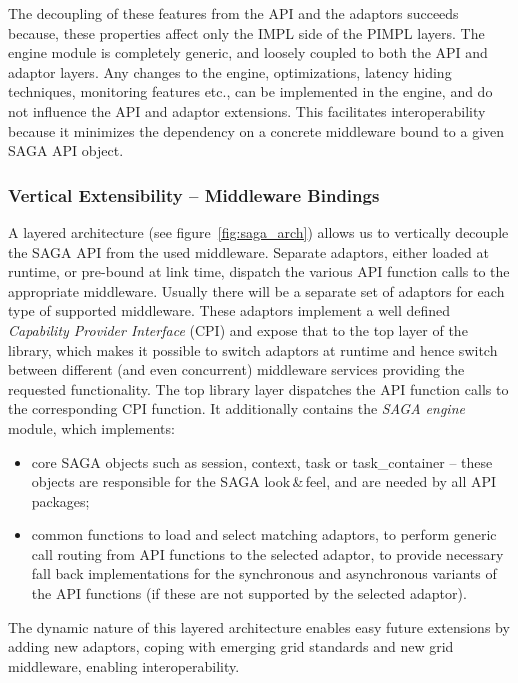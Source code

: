 \documentclass[conference,final]{IEEEtran}
\newcommand{\I}{\textit}
\newenvironment{shortlist}{
  \begin{itemize}
  \setlength{\itemsep}{-0.1em}
}{
  \end{itemize}
}
\begin{document}
The decoupling of these features from the API and the adaptors
succeeds because, these properties affect only the IMPL side of the
PIMPL layers.  The engine module is completely generic, and loosely
coupled to both the API and adaptor layers.  Any changes to the
engine, optimizations, latency hiding techniques, monitoring features
etc., can be implemented in the engine, and do not influence the API
and adaptor extensions. This facilitates interoperability because it
minimizes the dependency on a concrete middleware bound to a given
SAGA API object.

\subsubsection{Vertical Extensibility -- Middleware Bindings}

A layered architecture (see figure~\ref{fig:saga_arch}) allows us to
vertically decouple the SAGA API from the used middleware. Separate
adaptors, either loaded at runtime, or pre-bound at link time,
dispatch the various API function calls to the appropriate middleware.
Usually there will be a separate set of adaptors for each type of
supported middleware.  These adaptors implement a well defined
\I{Capability Provider Interface} (CPI) and expose that to the top
layer of the library, which makes it possible to switch adaptors at
runtime and hence switch between different (and even concurrent)
middleware services providing the requested functionality.  The top
library layer dispatches the API function calls to the corresponding
CPI function.  It additionally contains the \I{SAGA engine} module,
which implements:
\begin{shortlist}
\item core SAGA objects such as session, context, task or
  task\_container -- these objects are responsible for the SAGA
  look\,\&\,feel, and are needed by all API packages;
\item common functions to load and select matching adaptors, to
  perform generic call routing from API functions to the selected
  adaptor, to provide necessary fall back implementations for the
  synchronous and asynchronous variants of the API functions (if these
  are not supported by the selected adaptor).
\end{shortlist}

The dynamic nature of this layered architecture enables easy future
extensions by adding new adaptors, coping with emerging grid standards
and new grid middleware, enabling interoperability.
	
\end{document}
